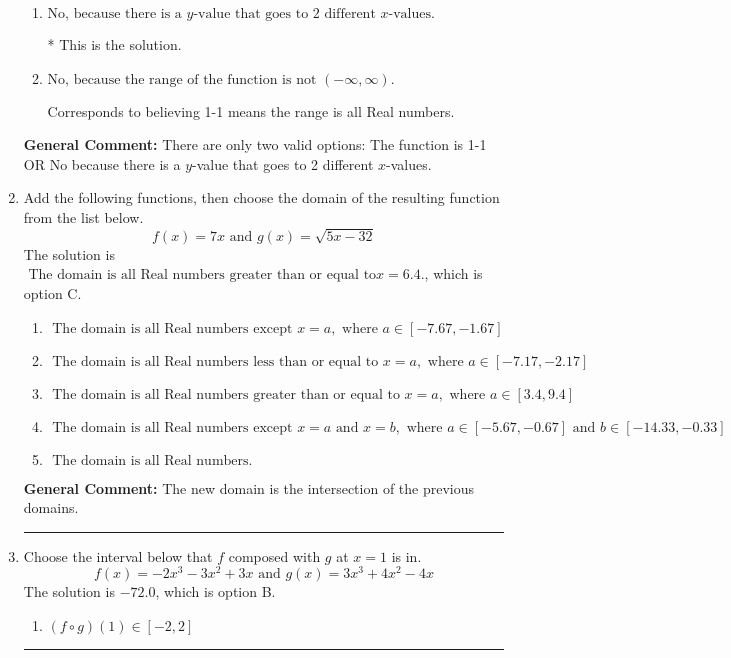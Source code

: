 \documentclass{extbook}[14pt]
\newcommand{\litem}[1]{\item #1

\rule{\textwidth}{0.4pt}}
\begin{document}
\begin{enumerate}
{\begin{enumerate}[label=\Alph*.]
Corresponds to believing 1-1 means the domain is all Real numbers.
\item \( \text{No, because there is a $y$-value that goes to 2 different $x$-values.} \)

* This is the solution.
\item \( \text{No, because the range of the function is not $(-\infty, \infty)$.} \)

Corresponds to believing 1-1 means the range is all Real numbers.
\end{enumerate}

\textbf{General Comment:} There are only two valid options: The function is 1-1 OR No because there is a $y$-value that goes to 2 different $x$-values.
}
\litem{
Add the following functions, then choose the domain of the resulting function from the list below.
\[ f(x) = 7x \text{ and } g(x) = \sqrt{5x-32}  \]The solution is \( \text{ The domain is all Real numbers greater than or equal to} x = 6.4. \), which is option C.\begin{enumerate}[label=\Alph*.]
\item \( \text{ The domain is all Real numbers except } x = a, \text{ where } a \in [-7.67, -1.67] \)


\item \( \text{ The domain is all Real numbers less than or equal to } x = a, \text{ where } a \in [-7.17, -2.17] \)


\item \( \text{ The domain is all Real numbers greater than or equal to } x = a, \text{ where } a \in [3.4, 9.4] \)


\item \( \text{ The domain is all Real numbers except } x = a \text{ and } x = b, \text{ where } a \in [-5.67, -0.67] \text{ and } b \in [-14.33, -0.33] \)


\item \( \text{ The domain is all Real numbers. } \)


\end{enumerate}

\textbf{General Comment:} The new domain is the intersection of the previous domains.
}
\litem{
Choose the interval below that $f$ composed with $g$ at $x=1$ is in.
\[ f(x) = -2x^{3} -3 x^{2} +3 x \text{ and } g(x) = 3x^{3} +4 x^{2} -4 x \]The solution is \( -72.0 \), which is option B.\begin{enumerate}[label=\Alph*.]
\item \( (f \circ g)(1) \in [-2, 2] \)


\end{enumerate}}
\end{enumerate}
\end{document}
